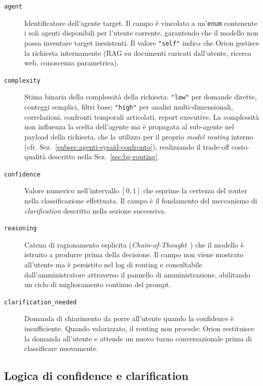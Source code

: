 \begin{description}
  \item[\texttt{agent}] Identificatore dell'agente target.
  Il campo è vincolato a un'\texttt{enum} contenente i soli agenti disponibili per l'utente corrente,
  garantendo che il modello non possa inventare target inesistenti.
  Il valore \texttt{"self"} indica che Orion gestisce la richiesta internamente
  (RAG su documenti caricati dall'utente, ricerca web, conoscenza parametrica).

  \item[\texttt{complexity}] Stima binaria della complessità della richiesta: \texttt{"low"} per domande dirette,
  conteggi semplici, filtri base; \texttt{"high"} per analisi multi-dimensionali, correlazioni,
  confronti temporali articolati, report executive.
  La complessità non influenza la scelta dell'agente ma è propagata al sub-agente nel
  payload della richiesta, che la utilizza per il proprio \emph{model routing} interno (cfr. Sez.~\ref{subsec:agenti-sysaid-confronto}),
  realizzando il trade-off costo--qualità descritto nella Sez.~\ref{sec:bg-routing}.

  \item[\texttt{confidence}] Valore numerico nell'intervallo $[0, 1]$
  che esprime la certezza del router nella classificazione effettuata.
  Il campo è il fondamento del meccanismo di \emph{clarification} descritto nella sezione successiva.

  \item[\texttt{reasoning}] Catena di ragionamento esplicita (\emph{Chain-of-Thought}~\cite{wei2022cot})
  che il modello è istruito a produrre prima della decisione.
  Il campo non viene mostrato all'utente ma è persistito nel log di routing e
  consultabile dall'amministratore attraverso il pannello di amministrazione,
  abilitando un ciclo di miglioramento continuo del prompt.

  \item[\texttt{clarification\_needed}] Domanda di chiarimento da porre all'utente quando la confidence è insufficiente.
  Quando valorizzato, il routing non procede: Orion restituisce la domanda all'utente e
  attende un nuovo turno conversazionale prima di classificare nuovamente.

\end{description}

\subsection{Logica di confidence e clarification}
\label{subsec:orion-confidence}

